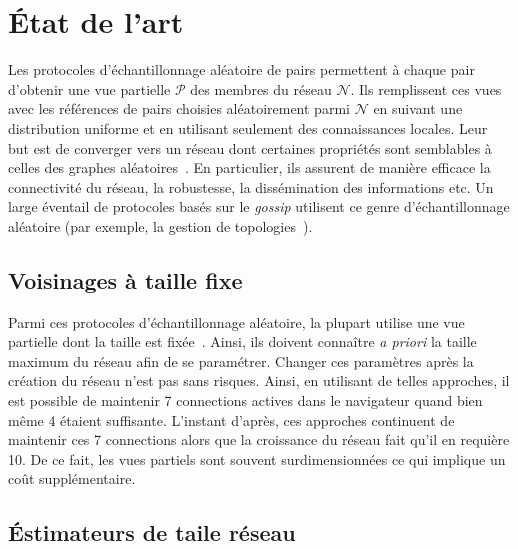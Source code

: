 
\section{État de l'art}

Les protocoles d'échantillonnage aléatoire de pairs permettent à chaque pair
d'obtenir une vue partielle $\mathcal{P}$ des membres du réseau $\mathcal{N}$.
Ils remplissent ces vues avec les références de pairs choisies aléatoirement
parmi $\mathcal{N}$ en suivant une distribution uniforme et en utilisant
seulement des connaissances locales. Leur but est de converger vers un réseau
dont certaines propriétés sont semblables à celles des graphes
aléatoires~\cite{erdos1959random}. En particulier, ils assurent de manière
efficace la connectivité du réseau, la robustesse, la dissémination des
informations etc. Un large éventail de protocoles basés sur le \emph{gossip}
utilisent ce genre d'échantillonnage aléatoire (par exemple, la gestion de
topologies~\cite{jelasity2009tman, dabek2004vivaldi}).

\subsection{Voisinages à taille fixe}

Parmi ces protocoles d'échantillonnage aléatoire, la plupart utilise une vue
partielle dont la taille est fixée~\cite{tolgyeski2009adaptive,
  eugster2003lightweight, voulgaris2005cyclon}. Ainsi, ils doivent connaître
\emph{a priori} la taille maximum du réseau afin de se paramétrer. Changer ces
paramètres après la création du réseau n'est pas sans risques. Ainsi, en
utilisant de telles approches, il est possible de maintenir 7 connections
actives dans le navigateur quand bien même 4 étaient suffisante. L'instant
d'après, ces approches continuent de maintenir ces 7 connections alors que la
croissance du réseau fait qu'il en requière 10. De ce fait, les vues partiels
sont souvent surdimensionnées ce qui implique un coût supplémentaire.

\subsection{Éstimateurs de taile réseau}

